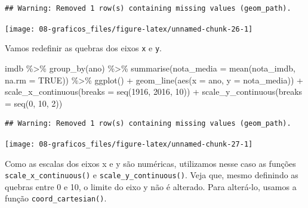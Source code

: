 \documentclass[
]{book}
\newenvironment{Shaded}{\begin{snugshade}}{\end{snugshade}}
\newcommand{\AttributeTok}[1]{\textcolor[rgb]{0.77,0.63,0.00}{#1}}
\newcommand{\ConstantTok}[1]{\textcolor[rgb]{0.00,0.00,0.00}{#1}}
\newcommand{\DecValTok}[1]{\textcolor[rgb]{0.00,0.00,0.81}{#1}}
\newcommand{\FunctionTok}[1]{\textcolor[rgb]{0.00,0.00,0.00}{#1}}
\newcommand{\NormalTok}[1]{#1}
\newcommand{\SpecialCharTok}[1]{\textcolor[rgb]{0.00,0.00,0.00}{#1}}
\begin{document}
\begin{verbatim}
## Warning: Removed 1 row(s) containing missing values (geom_path).
\end{verbatim}

\begin{center}\texttt{[image: 08-graficos\_files/figure-latex/unnamed-chunk-26-1]} \end{center}

Vamos redefinir as quebras dos eixos \texttt{x} e \texttt{y}.

\begin{Shaded}
\begin{Highlighting}[]
\NormalTok{imdb }\SpecialCharTok{\%\textgreater{}\%} 
  \FunctionTok{group\_by}\NormalTok{(ano) }\SpecialCharTok{\%\textgreater{}\%} 
  \FunctionTok{summarise}\NormalTok{(}\AttributeTok{nota\_media =} \FunctionTok{mean}\NormalTok{(nota\_imdb, }\AttributeTok{na.rm =} \ConstantTok{TRUE}\NormalTok{)) }\SpecialCharTok{\%\textgreater{}\%} 
  \FunctionTok{ggplot}\NormalTok{() }\SpecialCharTok{+}
  \FunctionTok{geom\_line}\NormalTok{(}\FunctionTok{aes}\NormalTok{(}\AttributeTok{x =}\NormalTok{ ano, }\AttributeTok{y =}\NormalTok{ nota\_media)) }\SpecialCharTok{+}
  \FunctionTok{scale\_x\_continuous}\NormalTok{(}\AttributeTok{breaks =} \FunctionTok{seq}\NormalTok{(}\DecValTok{1916}\NormalTok{, }\DecValTok{2016}\NormalTok{, }\DecValTok{10}\NormalTok{)) }\SpecialCharTok{+}
  \FunctionTok{scale\_y\_continuous}\NormalTok{(}\AttributeTok{breaks =} \FunctionTok{seq}\NormalTok{(}\DecValTok{0}\NormalTok{, }\DecValTok{10}\NormalTok{, }\DecValTok{2}\NormalTok{))}
\end{Highlighting}
\end{Shaded}

\begin{verbatim}
## Warning: Removed 1 row(s) containing missing values (geom_path).
\end{verbatim}

\begin{center}\texttt{[image: 08-graficos\_files/figure-latex/unnamed-chunk-27-1]} \end{center}

Como as escalas dos eixos x e y são numéricas, utilizamos nesse caso as funções \texttt{scale\_x\_continuous()} e \texttt{scale\_y\_continuous()}. Veja que, mesmo definindo as quebras entre 0 e 10, o limite do eixo y não é alterado. Para alterá-lo, usamos a função \texttt{coord\_cartesian()}.
\end{document}
